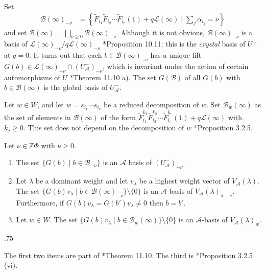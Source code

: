 \documentclass[11pt,fleqn]{article}
\makeatletter
\renewenvironment{proof}[1][\textit{Proof}]{\par
  \pushQED{\qed}%
  \normalfont \topsep.75\paraskip\relax
  \trivlist
  \item[\hskip\labelsep
        \itshape
    #1\@addpunct{.}]\ignorespaces
}{%
  \popQED\endtrivlist\@endpefalse
}
\newcommand\ZZ{\mathbb Z}
\newcommand\A{\mathcal A}
\newcommand\B{\mathcal B}
\renewcommand\L{\mathcal L}
\makeatother
\begin{document}
Set
\begin{align*}
\B(\infty)_{-\nu} 
  &=  \left\{\tilde F_{i_1} \tilde F_{i_2} \cdots 
    \tilde F_{i_r}(1) + q\L(\infty) \mid \sum_{j} \alpha_{i_j} = \nu\right\}
\end{align*}
and set $\B(\infty) = \bigsqcup_{\nu \geq 0} \B(\infty)_{-\nu}$. Although it is
not obvious, $\B(\infty)_{-\nu}$ is a basis of $\L(\infty)_{-\nu} / 
q \L(\infty)_{-\nu}$ \cite{Jan}*{Proposition 10.11}; this is the \emph{crystal}
basis of $U^-$ at $q = 0$. It turns out that each 
$b \in \B(\infty)_{-\nu}$ has a unique lift $G(b) \in \L(\infty)_{-\nu} \cap 
(U_\A^-)_{-\nu}$, which is invariant under the action of certain automorphisms 
of $U$ \cite{Jan}*{Theorem 11.10 a)}. The set $G(\B)$ of all $G(b)$ with $b 
\in \B(\infty)$ is the global basis of $U_\A^-$.

Let $w \in W$, and let $w = s_{i_1}\cdots s_{i_r}$ be a reduced decomposition 
of $w$. Set $\B_w(\infty)$ as the set of elements in $\B(\infty)$ of the form 
$\tilde F_{i_1}^{k_1} \tilde F_{i_2}^{k_2} \cdots \tilde 
F_{i_r}^{k_r}(1) + q\L(\infty)$ with $k_j \geq 0$. This set does not depend on 
the decomposition of $w$ \cite{K1}*{Proposition 3.2.5}.

\begin{Theorem*}
Let $\nu \in \ZZ \Phi$ with $\nu \geq 0$.
\begin{enumerate}[label=(\alph*)]
\item The set $\{G(b) \mid b \in \B_{-\nu}\}$ is an $\A$ basis of 
$(U_\A^-)_{- \nu}$.

\item Let $\lambda$ be a dominant weight and let $v_\lambda$ be a highest 
weight vector of $V_\A(\lambda)$. The set $\{G(b)v_\lambda \mid b \in 
\B(\infty)_{-\nu}\} \setminus \{0\}$ is an $\A$-basis of 
$V_\A(\lambda)_{\lambda - \nu}$. Furthermore, if $G(b)v_\lambda = 
G(b')v_\lambda \neq 0$ then $b = b'$.

\item Let $w \in W$. The set $\{G(b)v_\lambda \mid b \in \B_w(\infty)\} 
\setminus \{0\}$ is an $\A$-basis of $V_\A(\lambda)_{w}$. 
\end{enumerate}
\end{Theorem*}
\begin{proof}
The first two items are part of \cite{Jan}*{Theorem 11.10}. The third is 
\cite{K1}*{Proposition 3.2.5 (vi)}.
\end{proof}
\end{document}
